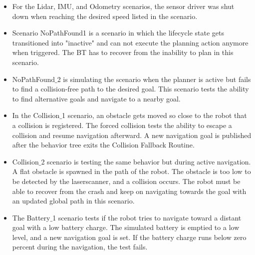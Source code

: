 \begin{itemize}
	\item For the Lidar, IMU, and Odometry scenarios, the sensor driver was shut down when reaching the desired speed listed in the scenario. 

	\item Scenario NoPathFound1 is a scenario in which the lifecycle state gets transitioned into "inactive" and can not execute the planning action anymore when triggered. The BT has to recover from the inability to plan in this scenario.

	\item NoPathFound$\_$2 is simulating the scenario when the planner is active but fails to find a collision-free path to the desired goal. This scenario tests the ability to find alternative goals and navigate to a nearby goal. 

	\item In the Collision$\_$1 scenario, an obstacle gets moved so close to the robot that a collision is registered. The forced collision tests the ability to escape a collision and resume navigation afterward. A new navigation goal is published after the behavior tree exits the Collision Fallback Routine.

	\item Collision$\_$2 scenario is testing the same behavior but during active navigation. A flat obstacle is spawned in the path of the robot. The obstacle is too low to be detected by the laserscanner, and a collision occurs. The robot must be able to recover from the crash and keep on navigating towards the goal with an updated global path in this scenario. 

	\item The Battery$\_$1 scenario tests if the robot tries to navigate toward a distant goal with a low battery charge. The simulated battery is emptied to a low level, and a new navigation goal is set. If the battery charge runs below zero percent during the navigation, the test fails. 
\end{itemize}

